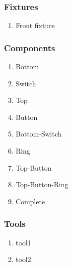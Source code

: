 \documentclass[10pt,a4paper]{report}
\begin{document}
\subsubsection*{Fixtures}
\begin{enumerate}
\item Front fixture
\end{enumerate}

\subsubsection*{Components}
\begin{enumerate}
\item Bottom
\item Switch
\item Top
\item Button
\item Bottom-Switch
\item Ring
\item Top-Button
\item Top-Button-Ring
\item Complete
\end{enumerate}

\subsubsection*{Tools}
\begin{enumerate}
\item tool1
\item tool2
\end{enumerate}

\newcommand*\rot{\rotatebox{90}}
\end{document}
